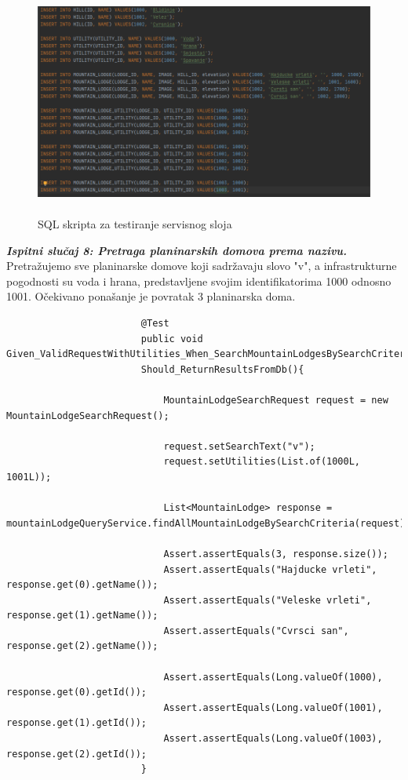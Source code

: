 					\begin{figure}[H]
						\includegraphics[scale=0.6, height=75mm, width=150mm]{slike/servis-sql.png} %
						\centering
						\caption{SQL skripta za testiranje servisnog sloja}
						\label{fig:SQL skripta}
					\end{figure}
					
					\eject 
					 
					
					\textbf{\textit{Ispitni slučaj 8: Pretraga planinarskih domova prema nazivu.}}\\
					Pretražujemo sve planinarske domove koji sadržavaju slovo "v", a infrastrukturne pogodnosti su voda i hrana, predstavljene svojim identifikatorima 1000 odnosno 1001.
					Očekivano ponašanje je povratak 3 planinarska doma.\\
					
					
					\begin{lstlisting}
						@Test
						public void Given_ValidRequestWithUtilities_When_SearchMountainLodgesBySearchCriteria_
						Should_ReturnResultsFromDb(){
							
							MountainLodgeSearchRequest request = new MountainLodgeSearchRequest();
							
							request.setSearchText("v");
							request.setUtilities(List.of(1000L, 1001L));
							
							List<MountainLodge> response = mountainLodgeQueryService.findAllMountainLodgeBySearchCriteria(request);
							
							Assert.assertEquals(3, response.size());
							Assert.assertEquals("Hajducke vrleti", response.get(0).getName());
							Assert.assertEquals("Veleske vrleti", response.get(1).getName());
							Assert.assertEquals("Cvrsci san", response.get(2).getName());
							
							Assert.assertEquals(Long.valueOf(1000), response.get(0).getId());
							Assert.assertEquals(Long.valueOf(1001), response.get(1).getId());
							Assert.assertEquals(Long.valueOf(1003), response.get(2).getId());
						}
					\end{lstlisting}
				
